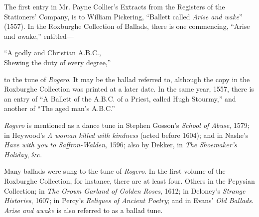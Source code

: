 The first entry in Mr. Payne Collier’s Extracts from the Registers of the
Stationers’ Company, is to William Pickering,  “Ballett called \textit{Arise and wake}”
(1557). In the Roxburghe Collection of Ballads, there is one commencing,
“Arise and \textit{a}wake,” entitled—

\begin{scverse}
“A godly and Christian A.B.C.,\\
Shewing the duty of every degree,”
\end{scverse}
to the tune of \textit{Rogero}. It may be the ballad referred to, although the copy in the
Roxburghe Collection was printed at a later date. In the same year, 1557, there
is an entry of “A Ballett of the A.B.C. of a Priest, called Hugh Stourmy,”
and another of “The aged man’s A.B.C.”
\pagebreak

\textit{Rogero} is mentioned as a dance tune in Stephen Gosson’s \textit{School of Abuse},
1579; in Heywood’s \textit{A woman killed with kindness} (acted before 1604); and in
Nashe’s \textit{Have with you to Saffron-Walden}, 1596; also by Dekker, in \textit{The Shoemaker’s
Holiday}, \&c.

Many ballads were sung to the tune of \textit{Rogero}. In the first volume of the
Roxburghe Collection, for instance, there are at least four.  Others in the
Pepysian Collection; in \textit{The Grown Garland of Golden Roses}, 1612; in Deloney’s
\textit{Strange Histories}, 1607; in Percy’s \textit{Reliques of Ancient Poetry}; and in Evans’
\textit{Old Ballads}. \textit{Arise and awake} is also referred to as a ballad tune.

